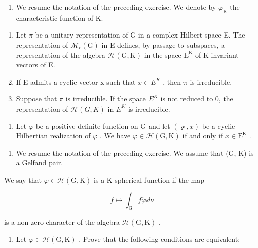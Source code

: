 \begin{enumerate}
\def\labelenumi{\arabic{enumi})}
\setcounter{enumi}{25}
\tightlist
\item
  We resume the notation of the preceding exercise. We denote by \(\varphi_{\mathrm{K}}\) the characteristic function of K.
\end{enumerate}

\begin{enumerate}
\def\labelenumi{\alph{enumi})}
\item
  Let \(\pi\) be a unitary representation of G in a complex Hilbert space E. The representation of \(\mathcal{M}_c(\mathrm{G})\) in E defines, by passage to subspaces, a representation of the algebra \(\mathcal{H}(\mathrm{G},\mathrm{K})\) in the space \(\mathrm{E}^{\mathrm{K}}\) of K-invariant vectors of E.
\item
  If E admits a cyclic vector x such that \(x \in E^{K}\) , then \(\pi\) is irreducible.
\item
  Suppose that \(\pi\) is irreducible. If the space \(E^{K}\) is not reduced to 0, the representation of \(\mathcal{H}(G,K)\) in \(E^{K}\) is irreducible.
\end{enumerate}

\begin{enumerate}
\def\labelenumi{\alph{enumi})}
\setcounter{enumi}{3}
\tightlist
\item
  Let \(\varphi\) be a positive-definite function on G and let \((\varrho, x)\) be a cyclic Hilbertian realization of \(\varphi\) . We have \(\varphi \in \mathcal{H}(\mathrm{G}, \mathrm{K})\) if and only if \(x \in \mathrm{E}^{\mathrm{K}}\) .
\end{enumerate}

\begin{enumerate}
\def\labelenumi{\arabic{enumi})}
\setcounter{enumi}{26}
\tightlist
\item
  We resume the notation of the preceding exercise. We assume that (G, K) is a Gelfand pair.
\end{enumerate}

We say that \(\varphi\in\mathcal{H}(\mathrm{G},\mathrm{K})\) is a K-spherical function if the map

\[
f \mapsto \int_ {\mathrm{G}} f \check {\varphi} d \nu
\]

is a non-zero character of the algebra \(\mathcal{H}(\mathrm{G},\mathrm{K})\) .

\begin{enumerate}
\def\labelenumi{\alph{enumi})}
\tightlist
\item
  Let \(\varphi \in \mathcal{H}(\mathrm{G},\mathrm{K})\) . Prove that the following conditions are equivalent:
\end{enumerate}

